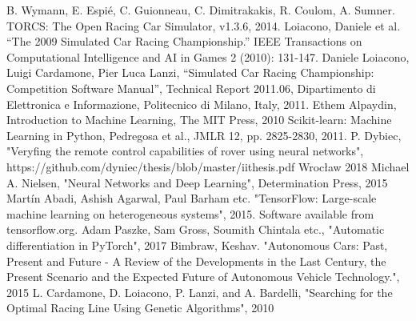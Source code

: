 \documentclass[declaration,shortabstract,english,inz]{iithesis}
\begin{document}
\begin{thebibliography}{1}
 B. Wymann, E. Espié, C. Guionneau, C. Dimitrakakis, R. Coulom, A. Sumner. TORCS: The Open Racing Car Simulator, v1.3.6, 2014.
 Loiacono, Daniele et al. “The 2009 Simulated Car Racing Championship.” IEEE Transactions on Computational Intelligence and AI in Games 2 (2010): 131-147.
 Daniele Loiacono, Luigi Cardamone, Pier Luca Lanzi, “Simulated Car
Racing Championship: Competition Software Manual”, Technical Report 2011.06, Dipartimento
di Elettronica e Informazione, Politecnico di Milano, Italy, 2011.
 Ethem Alpaydin, Introduction to Machine Learning, The MIT Press, 2010
 Scikit-learn: Machine Learning in Python, Pedregosa et al., JMLR 12, pp. 2825-2830, 2011.
 P. Dybiec, "Veryfing the remote control capabilities of rover using neural networks", https://github.com/dyniec/thesis/blob/master/iithesis.pdf Wrocław 2018
 Michael A. Nielsen, "Neural Networks and Deep Learning", Determination Press, 2015
 Martín Abadi, Ashish Agarwal, Paul Barham etc.
"TensorFlow: Large-scale machine learning on heterogeneous systems",
2015. Software available from tensorflow.org.
 Adam Paszke, Sam Gross, Soumith Chintala etc., "Automatic differentiation in PyTorch", 2017
 Bimbraw, Keshav. "Autonomous Cars: Past, Present and Future - A Review of the Developments in the Last Century, the Present Scenario and the Expected Future of Autonomous Vehicle Technology.", 2015
 L. Cardamone, D. Loiacono, P. Lanzi, and A. Bardelli, "Searching for the Optimal Racing Line Using Genetic Algorithms", 2010


\end{thebibliography}
\end{document}
